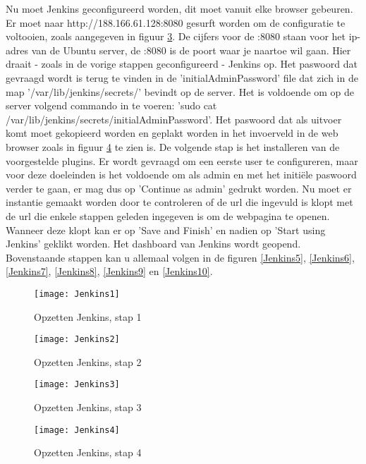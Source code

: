     Nu moet Jenkins geconfigureerd worden, dit moet vanuit elke browser gebeuren.
    Er moet naar http://188.166.61.128:8080 gesurft worden om de configuratie te voltooien, zoals aangegeven in figuur \ref{Jenkins3}. De cijfers voor de :8080 staan voor het ip-adres van de Ubuntu server, de :8080 is de poort waar je naartoe wil gaan. Hier draait - zoals in de vorige stappen geconfigureerd - Jenkins op.
    Het paswoord dat gevraagd wordt is terug te vinden in de 'initialAdminPassword' file dat zich in de map '/var/lib/jenkins/secrets/' bevindt op de server. Het is voldoende om op de server volgend commando in te voeren: 'sudo cat /var/lib/jenkins/secrets/initialAdminPassword'. Het paswoord dat als uitvoer komt moet gekopieerd worden en geplakt worden in het invoerveld in de web browser zoals in figuur \ref{Jenkins4} te zien is.
    De volgende stap is het installeren van de voorgestelde plugins. Er wordt gevraagd om een eerste user te configureren, maar voor deze doeleinden is het voldoende om als admin en met het initiële paswoord verder te gaan, er mag dus op 'Continue as admin' gedrukt worden. Nu moet er instantie gemaakt worden door te controleren of de url die ingevuld is klopt met de url die enkele stappen geleden ingegeven is om de webpagina te openen. Wanneer deze klopt kan er op 'Save and Finish' en nadien op 'Start using Jenkins' geklikt worden. Het dashboard van Jenkins wordt geopend. Bovenstaande stappen kan u allemaal volgen in de figuren \ref{Jenkins5}, \ref{Jenkins6}, \ref{Jenkins7}, \ref{Jenkins8}, \ref{Jenkins9} en \ref{Jenkins10}.
    
    \begin{figure}	
        \texttt{[image: Jenkins1]}
        \caption{Opzetten Jenkins, stap 1} \label{Jenkins1}
    \end{figure}
    
    \begin{figure}	
        \texttt{[image: Jenkins2]}
        \caption{Opzetten Jenkins, stap 2} \label{Jenkins2}
    \end{figure}
    
    \begin{figure}	
        \texttt{[image: Jenkins3]}
        \caption{Opzetten Jenkins, stap 3} \label{Jenkins3}
    \end{figure}
    
    \begin{figure}	
        \texttt{[image: Jenkins4]}
        \caption{Opzetten Jenkins, stap 4} \label{Jenkins4}
    \end{figure}
    
